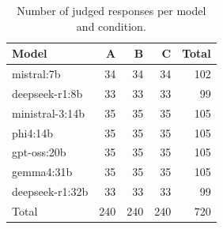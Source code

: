\begin{table}[H]
\caption{Number of judged responses per model and condition.}
\label{tab:sample}
\centering
\begin{tabular}{lrrrr}
\toprule
Model & A & B & C & Total \\
\midrule
mistral:7b & 34 & 34 & 34 & 102 \\
deepseek-r1:8b & 33 & 33 & 33 & 99 \\
ministral-3:14b & 35 & 35 & 35 & 105 \\
phi4:14b & 35 & 35 & 35 & 105 \\
gpt-oss:20b & 35 & 35 & 35 & 105 \\
gemma4:31b & 35 & 35 & 35 & 105 \\
deepseek-r1:32b & 33 & 33 & 33 & 99 \\
\midrule
Total & 240 & 240 & 240 & 720 \\
\bottomrule
\end{tabular}
\end{table}
